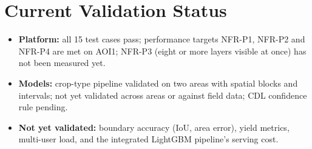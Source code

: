 \section{Current Validation Status}
\begin{itemize}
  \item \textbf{Platform:} all 15 test cases pass; performance targets NFR-P1, NFR-P2 and NFR-P4 are met
        on AOI1; NFR-P3 (eight or more layers visible at once) has not been measured yet.
  \item \textbf{Models:} crop-type pipeline validated on two areas with spatial blocks and intervals;
        not yet validated across areas or against field data; CDL confidence rule pending.
  \item \textbf{Not yet validated:} boundary accuracy (IoU, area error), yield metrics, multi-user
        load, and the integrated LightGBM pipeline's serving cost.
\end{itemize}
